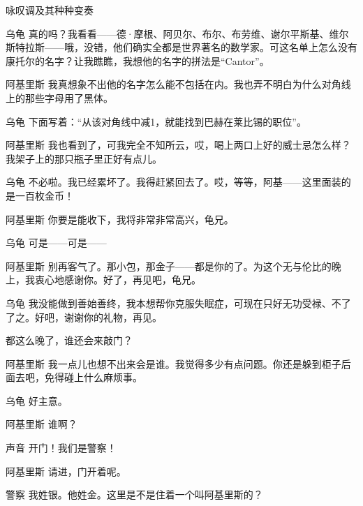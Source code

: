 \begin{dialog}{咏叹调及其种种变奏}
\begin{dialogue}
\item[乌龟]真的吗？我看看——德·摩根、阿贝尔、布尔、布劳维、谢尔平斯基、维尔斯特拉斯——哦，没错，他们确实全都是世界著名的数学家。可这名单上怎么没有康托尔的名字？让我瞧瞧，我想他的名字的拼法是“Cantor”。

\item[阿基里斯]我真想象不出他的名字怎么能不包括在内。我也弄不明白为什么对角线上的那些字母用了黑体。

\item[乌龟]下面写着：“从该对角线中减1，就能找到巴赫在莱比锡的职位”。

\item[阿基里斯]我也看到了，可我完全不知所云，哎，喝上两口上好的威士忌怎么样？我架子上的那只瓶子里正好有点儿。

\item[乌龟]不必啦。我已经累坏了。我得赶紧回去了。哎，等等，阿基——这里面装的是一百枚金币！

\item[阿基里斯]你要是能收下，我将非常非常高兴，龟兄。

\item[乌龟]可是——可是——

\item[阿基里斯]别再客气了。那小包，那金子——都是你的了。为这个无与伦比的晚上，我衷心地感谢你。好了，再见吧，龟兄。

\item[乌龟]我没能做到善始善终，我本想帮你克服失眠症，可现在只好无功受禄、不了了之。好吧，谢谢你的礼物，再见。


都这么晚了，谁还会来敲门？

\item[阿基里斯]我一点儿也想不出来会是谁。我觉得多少有点问题。你还是躲到柜子后面去吧，免得碰上什么麻烦事。

\item[乌龟]好主意。

\item[阿基里斯]谁啊？

\item[声音]开门！我们是警察！

\item[阿基里斯]请进，门开着呢。


\item[警察]我姓银。他姓金。这里是不是住着一个叫阿基里斯的？


\end{dialogue}
\end{dialog}
